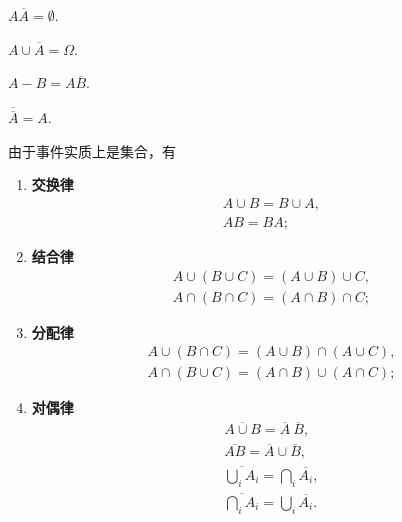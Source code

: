 \begin{property}
\(A \overline{A} = \emptyset\).
\end{property}

\begin{property}
\(A \cup \overline{A} = \Omega\).
\end{property}

\begin{property}
\(A - B = A \overline{B}\).
\end{property}

\begin{property}
\(\overline{\overline{A}} = A\).
\end{property}

\begin{theorem}[事件的运算规律]
由于事件实质上是集合，有
\begin{enumerate}
	\item {\rm\bf 交换律}
	\begin{gather}
		A \cup B = B \cup A, \\
		A B = B A;
	\end{gather}

	\item {\rm\bf 结合律}
	\begin{gather}
		A \cup (B \cup C) = (A \cup B) \cup C, \\
		A \cap (B \cap C) = (A \cap B) \cap C;
	\end{gather}

	\item {\rm\bf 分配律}
	\begin{gather}
		A \cup (B \cap C) = (A \cup B) \cap (A \cup C), \\
		A \cap (B \cup C) = (A \cap B) \cup (A \cap C);
	\end{gather}

	\item {\rm\bf 对偶律}
	\begin{gather}
		\overline{A \cup B} = \overline{A}\ \overline{B}, \\
		\overline{AB} = \overline{A} \cup \overline{B}, \\
		\overline{\bigcup_i A_i} = \bigcap_i \overline{A_i}, \\
		\overline{\bigcap_i A_i} = \bigcup_i \overline{A_i}.
	\end{gather}
\end{enumerate}
\end{theorem}

